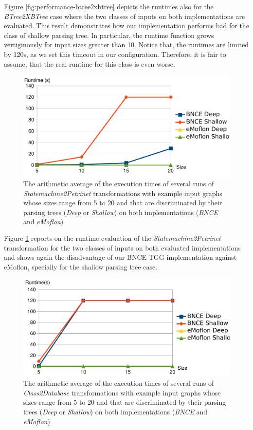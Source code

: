 Figure \ref{fig:performance-btree2xbtree} depicts the runtimes also for the \emph{BTree2XBTree} case where the two classes of inputs on both implementations are evaluated. This result demonstrates how our implementation performs bad for the class of shallow parsing tree. In particular, the runtime function grows vertiginously for input sizes greater than 10. Notice that, the runtimes are limited by 120s, as we set this timeout in our configuration. Therefore, it is fair to assume, that the real runtime for this class is even worse.

\begin{figure}
	\centering
	\includegraphics[width=.6\textwidth]{figures/performance/statemachine2petrinet}
	\caption{The arithmetic average of the execution times of several runs of \emph{Statemachine2Petrinet} transformations with example input graphs whose sizes range from 5 to 20 and that are discriminated by their parsing trees (\emph{Deep} or \emph{Shallow}) on both implementations (\emph{BNCE} and \emph{eMoflon})}
	\label{fig:performance-statemachine2petrinet}
\end{figure}

Figure \ref{fig:performance-statemachine2petrinet} reports on the runtime evaluation of the \emph{Statemachine2Petrinet} transformation for the two classes of inputs on both evaluated implementations and shows again the disadvantage of our BNCE TGG implementation against eMoflon, specially for the shallow parsing tree case.

\begin{figure}
	\centering
	\includegraphics[width=.6\textwidth]{figures/performance/class2database}
	\caption{The arithmetic average of the execution times of several runs of \emph{Class2Database} transformations with example input graphs whose sizes range from 5 to 20 and that are discriminated by their parsing trees (\emph{Deep} or \emph{Shallow}) on both implementations (\emph{BNCE} and \emph{eMoflon})}
	\label{fig:performance-class2database}
\end{figure}


